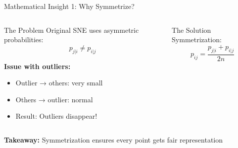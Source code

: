 \documentclass[aspectratio=169]{beamer}
\begin{document}

\begin{frame}{Mathematical Insight 1: Why Symmetrize?}
\begin{columns}
\begin{block}{The Problem}
Original SNE uses asymmetric probabilities:
$$p_{j|i} \neq p_{i|j}$$

\textbf{Issue with outliers:}
\begin{itemize}
\item Outlier → others: very small
\item Others → outlier: normal
\item Result: Outliers disappear!
\end{itemize}
\end{block}

\begin{block}{The Solution}
Symmetrization:
$$p_{ij} = \frac{p_{j|i} + p_{i|j}}{2n}$$

\begin{center}
\end{center}
\end{block}
\end{columns}

\vspace{3mm}
\begin{center}
\colorbox{green!20}{\parbox{0.85\textwidth}{\centering
\textbf{Takeaway:} Symmetrization ensures every point gets fair representation}}
\end{center}
\end{frame}
\end{document}
